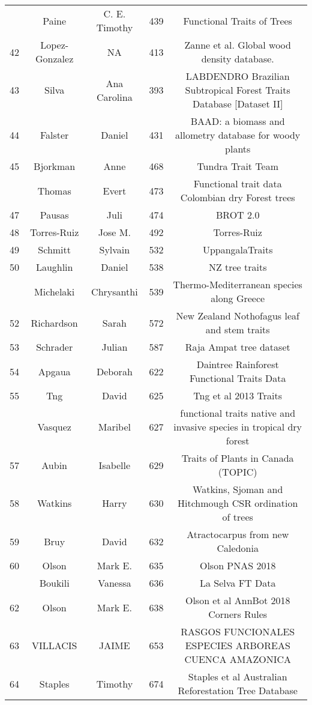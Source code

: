 \documentclass[
  12pt,
  letterpaper,
  DIV=11,
  numbers=noendperiod]{scrartcl}
\begin{document}
\begin{longtable*}[t]{ccccc}
 & Paine & C. E. Timothy & 439 & Functional Traits of Trees\\
42 & Lopez-Gonzalez & NA & 413 & Zanne et al. Global wood density database.\\
43 & Silva & Ana Carolina & 393 & LABDENDRO Brazilian Subtropical Forest Traits Database [Dataset II]\\
44 & Falster & Daniel & 431 & BAAD: a biomass and allometry database for woody plants\\
45 & Bjorkman & Anne & 468 & Tundra Trait Team\\
 & Thomas & Evert & 473 & Functional trait data Colombian dry Forest trees\\
47 & Pausas & Juli & 474 & BROT 2.0\\
48 & Torres-Ruiz & Jose M. & 492 & Torres-Ruiz\\
49 & Schmitt & Sylvain & 532 & UppangalaTraits\\
50 & Laughlin & Daniel & 538 & NZ tree traits\\
 & Michelaki & Chrysanthi & 539 & Thermo-Mediterranean species along Greece\\
52 & Richardson & Sarah & 572 & New Zealand Nothofagus leaf and stem traits\\
53 & Schrader & Julian & 587 & Raja Ampat tree dataset\\
54 & Apgaua & Deborah & 622 & Daintree Rainforest Functional Traits Data\\
55 & Tng & David & 625 & Tng et al 2013 Traits\\
 & Vasquez & Maribel & 627 & functional traits native and invasive species in tropical dry forest\\
57 & Aubin & Isabelle & 629 & Traits of Plants in Canada (TOPIC)\\
58 & Watkins & Harry & 630 & Watkins, Sjoman and Hitchmough CSR ordination of trees\\
59 & Bruy & David & 632 & Atractocarpus from new Caledonia\\
60 & Olson & Mark E. & 635 & Olson PNAS 2018\\
 & Boukili & Vanessa & 636 & La Selva FT Data\\
62 & Olson & Mark E. & 638 & Olson et al AnnBot 2018 Corners Rules\\
63 & VILLACIS & JAIME & 653 & RASGOS FUNCIONALES ESPECIES ARBOREAS CUENCA AMAZONICA\\
64 & Staples & Timothy & 674 & Staples et al Australian Reforestation Tree Database\\

\end{longtable*}
\end{document}
